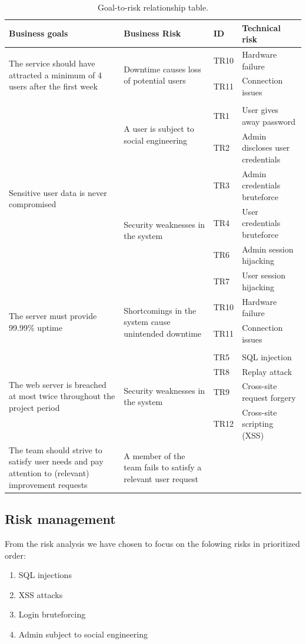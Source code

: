 \documentclass[a4paper]{article}
\begin{document}
\begin{table}[h!]
	\begin{tabular}{| p{4cm} | p{4cm}| l | l |}
    \hline
   	\textbf{Business goals} & \textbf{Business Risk} & \textbf{ID}  & \textbf{Technical risk} \\ \hline
    \multirow{3}{4cm}{The service should have attracted a minimum of 4 users after the first week} & \multirow{3}{4cm}{Downtime causes loss of potential users} & TR10 & Hardware failure \\ & & TR11 & Connection issues \\ & & & \\ \hline
    \multirow{6}{4cm}{Sensitive user data is never compromised} & \multirow{2}{4cm}{A user is subject to social engineering} & TR1 & User gives away password \\ & & TR2 & Admin discloses user credentials \\ & \multirow{4}{4cm}{Security weaknesses in the system} & TR3 & Admin credentials bruteforce \\ & & TR4 & User credentials bruteforce \\ & & TR6 & Admin session hijacking \\ & & TR7 & User session hijacking \\ \hline
    \multirow{3}{4cm}{The server must provide 99.99\% uptime} & \multirow{3}{4cm}{Shortcomings in the system cause unintended downtime} & TR10 & Hardware failure \\ & & TR11 & Connection issues \\ & & & \\ \hline
    \multirow{4}{4cm}{The web server is breached at most twice throughout the project period} & \multirow{4}{4cm}{Security weaknesses in the system} & TR5 & SQL injection \\ & & TR8 & Replay attack \\ & & TR9 & Cross-site request forgery \\ & & TR12 & Cross-site scripting (XSS) \\ \hline
    The team should strive to satisfy user needs and pay attention to (relevant) improvement requests & A member of the team fails to satisfy a relevant user request & & \\ \hline
    \end{tabular}
    \caption{Goal-to-risk relationship table.}
	\label{tab:goal_to_risk_relationship}
\end{table}

\subsection{Risk management}
From the risk analysis we have chosen to focus on the folowing risks in prioritized order:
\begin{enumerate}
\item{SQL injections}
\item{XSS attacks}
\item{Login bruteforcing}
\item{Admin subject to social engineering}
\end{enumerate}
\end{document}

